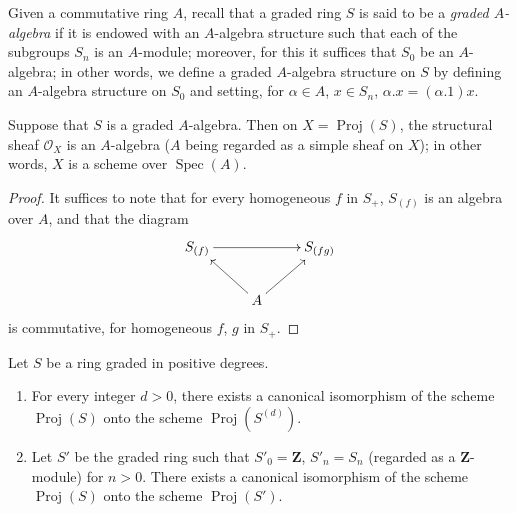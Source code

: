 \begin{env}[2.4.5]
\label{II.2.4.5}
Given a commutative ring $A$, recall that a graded ring $S$ is said to be
a \emph{graded $A$-algebra} if it is endowed with an $A$-algebra structure
such that each of the subgroups $S_n$ is an $A$-module;
moreover, for this it suffices that $S_0$ be
an $A$-algebra; in other words, we define a graded $A$-algebra structure on
$S$ by defining an $A$-algebra structure on $S_0$
and setting, for $\alpha\in A$, $x\in S_n$,
$\alpha.x=(\alpha.1)x$.
\end{env}

\begin{proposition}[2.4.6]
\label{II.2.4.6}
Suppose that $S$ is a graded $A$-algebra. Then on
$X=\operatorname{Proj}(S)$, the structural sheaf $\mathcal{O}_X$ is an
$A$-algebra ($A$ being regarded as a simple sheaf on $X$); in
other words, $X$ is a scheme over $\operatorname{Spec}(A)$.
\end{proposition}

\begin{proof}
It suffices to note that for every homogeneous $f$ in $S_+$, $S_{(f)}$ is
an algebra over $A$, and that the diagram
\[
  \xymatrix{
    S_{(f)}\ar[rr] && S_{(fg)}\\
    & A\ar[ul]\ar[ur] &
  }
\]
is commutative, for homogeneous $f$, $g$ in $S_+$.
\end{proof}

\begin{proposition}[2.4.7]
\label{II.2.4.7}
Let $S$ be a ring graded in positive degrees.
\begin{enumerate}
  \item[\rm(i)] For every integer $d>0$, there exists a canonical isomorphism
    of the scheme $\operatorname{Proj}(S)$ onto the scheme
    $\operatorname{Proj}(S^{(d)})$.
  \item[\rm(ii)] Let $S'$ be the graded ring such that $S'_0=\mathbf{Z}$,
    $S'_n=S_n$ (regarded as a $\mathbf{Z}$-module) for $n>0$. There exists
    a canonical isomorphism of the scheme $\operatorname{Proj}(S)$ onto the
    scheme $\operatorname{Proj}(S')$.
\end{enumerate}
\end{proposition}

